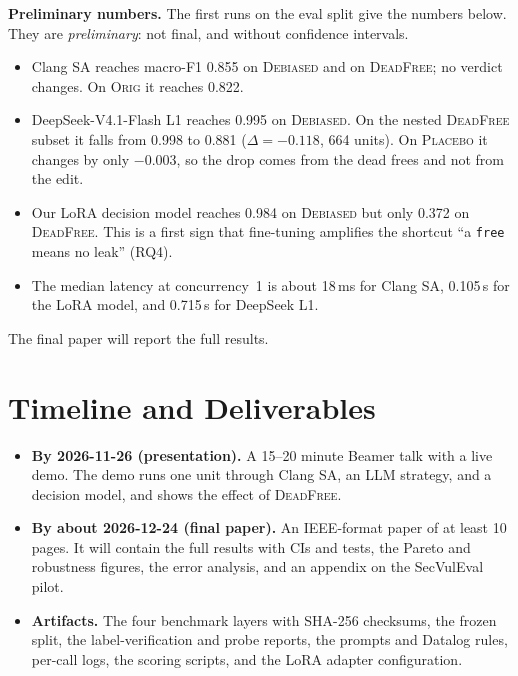 \documentclass[conference]{IEEEtran}
\newcommand{\Orig}{\textsc{Orig}}
\newcommand{\Deb}{\textsc{Debiased}}
\newcommand{\Dead}{\textsc{DeadFree}}
\newcommand{\Plac}{\textsc{Placebo}}
\newcommand{\code}[1]{\texttt{#1}}
\begin{document}
\textbf{Preliminary numbers.}
The first runs on the eval split give the numbers below. They are \emph{preliminary}: not final, and without confidence intervals.
\begin{itemize}
\item Clang SA reaches macro-F1 0.855 on \Deb{} and on \Dead{}; no verdict changes. On \Orig{} it reaches 0.822. %
\item DeepSeek-V4.1-Flash L1 reaches 0.995 on \Deb{}. On the nested \Dead{} subset it falls from 0.998 to 0.881 ($\Delta=-0.118$, 664 units). %
On \Plac{} it changes by only $-0.003$, so the drop comes from the dead frees and not from the edit. %
\item Our LoRA decision model reaches 0.984 on \Deb{} but only 0.372 on \Dead{}. This is a first sign that fine-tuning amplifies the shortcut ``a \code{free} means no leak'' (RQ4). %
\item The median latency at concurrency~1 is about 18\,ms for Clang SA, 0.105\,s for the LoRA model, and 0.715\,s for DeepSeek L1. %
\end{itemize}
The final paper will report the full results.

\section{Timeline and Deliverables}
\label{sec:timeline}
\begin{itemize}
\item \textbf{By 2026-11-26 (presentation).} A 15--20 minute Beamer talk with a live demo. The demo runs one unit through Clang SA, an LLM strategy, and a decision model, and shows the effect of \Dead{}. %
\item \textbf{By about 2026-12-24 (final paper).} An IEEE-format paper of at least 10 pages. It will contain the full results with CIs and tests, the Pareto and robustness figures, the error analysis, and an appendix on the SecVulEval pilot. %
\item \textbf{Artifacts.} The four benchmark layers with SHA-256 checksums, the frozen split, the label-verification and probe reports, the prompts and Datalog rules, per-call logs, the scoring scripts, and the LoRA adapter configuration.
\end{itemize}
\end{document}
